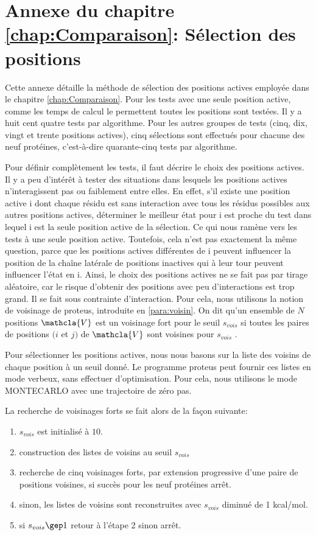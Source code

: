 \chapter*{Annexe du chapitre \ref{chap:Comparaison}: Sélection des positions }
\label{chap:annexeposi}
Cette annexe détaille la méthode de sélection des positions actives employée dans le chapitre \ref{chap:Comparaison}.
Pour les tests avec une seule position active, comme les temps de calcul le permettent toutes les positions sont testées. Il y a huit cent quatre tests par algorithme. Pour les autres groupes de tests (cinq, dix, vingt et trente positions actives), cinq sélections sont effectués pour chacune  des neuf protéines, c'est-à-dire quarante-cinq tests par algorithme.

Pour définir complètement les tests, il faut décrire le choix des positions actives.
Il y a peu d'intérêt à tester des situations dans lesquels les positions actives n'interagissent pas ou faiblement entre elles.
En effet, s'il existe une position active i dont chaque résidu est sans interaction avec tous les résidus possibles aux autres positions actives, déterminer le meilleur état pour i est proche du test dans lequel i est la seule position active de la sélection. Ce qui nous ramène vers les tests à une seule position active. Toutefois, cela n'est pas exactement la même question, parce que les positions actives différentes de i peuvent influencer la position de la chaîne latérale de positions inactives qui à leur tour peuvent influencer l'état en i. Ainsi, le choix des positions actives ne se fait pas par tirage aléatoire, car le risque d'obtenir des positions avec peu d'interactions est trop grand. Il se fait sous contrainte d'interaction. Pour cela, nous utilisons la notion de voisinage de proteus, introduite en \ref{para:voisin}. On dit qu'un ensemble de $N$ positions $\mathcla{V}$ est un \og voisinage fort \fg  pour le seuil $s_{vois}$ si toutes les paires de positions $(i$ et $j)$ de $\mathcla{V}$ sont voisines pour $s_{vois}$ .

Pour sélectionner les positions actives, nous nous basons sur la liste des voisins de chaque position à un seuil donné. Le programme proteus peut fournir ces listes en mode verbeux, sans effectuer d'optimisation. Pour cela, nous utilisons le mode MONTECARLO avec une trajectoire de zéro pas. 

La recherche de voisinages forts se fait alors de la façon suivante:

\begin{enumerate}
\item $s_{vois}$ est initialisé à $10$.
\item construction des listes de voisins au seuil $s_{vois}$  
\item recherche de cinq voisinages forts, par extension progressive d'une paire de positions voisines, si succès pour les neuf protéines arrêt.
\item sinon, les listes de voisins sont reconstruites avec $s_{vois}$  diminué de 1 kcal/mol. 
\item si $ s_{vois} \gep 1 $ retour à l'étape 2 sinon arrêt.  
\end{enumerate}

